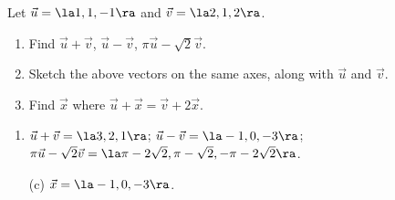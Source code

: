 {Let $\vec u = \la 1,1,-1\ra$ and $\vec v= \la 2,1,2\ra$. 
\begin{enumerate}
	\item Find $\vec u+\vec v$, $\vec u-\vec v$, $\pi\vec u-\sqrt{2}\vec v$.
	\item	Sketch the above vectors on the same axes, along with $\vec u$ and $\vec v$.
	\item		Find $\vec x$ where $\vec u+\vec x = \vec v+2\vec x$.
\end{enumerate}
}
{\begin{enumerate}
	\item $\vec u+\vec v = \la 3,2,1\ra$; $\vec u -\vec v = \la-1,0,-3\ra$; $\pi\vec u-\sqrt{2}\vec v = \la \pi-2\sqrt{2},\pi-\sqrt{2},-\pi-2\sqrt{2}\ra$.
	\item	[(c)]	$\vec x = \la-1,0,-3\ra$.
\end{enumerate}
}
